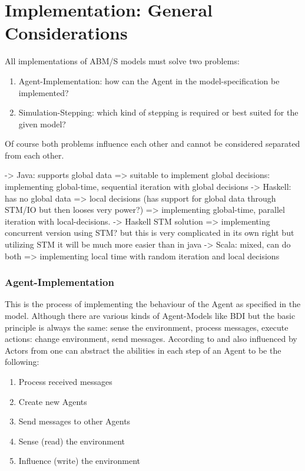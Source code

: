 \section{Implementation: General Considerations}
All implementations of ABM/S models must solve two problems:

\begin{enumerate}
\item Agent-Implementation: how can the Agent in the model-specification be implemented?
\item Simulation-Stepping: which kind of stepping is required or best suited for the given model?
\end{enumerate}

Of course both problems influence each other and cannot be considered separated from each other.

-> Java: supports global data => suitable to implement global decisions: implementing global-time, sequential iteration with global decisions
	-> Haskell: has no global data => local decisions (has support for global data through STM/IO but then looses very power?) => implementing global-time, parallel iteration with local-decisions. 
		-> Haskell STM solution => implementing concurrent version using STM? but this is very complicated in its own right but utilizing STM it will be much more easier than in java
	-> Scala: mixed, can do both => implementing local time with random iteration and local decisions
	
\subsubsection{Agent-Implementation}
This is the process of implementing the behaviour of the Agent as specified in the model. Although there are various kinds of Agent-Models like BDI but the basic principle is always the same: sense the environment, process messages, execute actions: change environment, send messages. According to \cite{wooldridge_introduction_2009} and also influenced by Actors from \cite{agha_actors:_1986} one can abstract the abilities in each step of an Agent to be the following:

\begin{enumerate}
\item Process received messages
\item Create new Agents
\item Send messages to other Agents
\item Sense (read) the environment
\item Influence (write) the environment
\end{enumerate}

